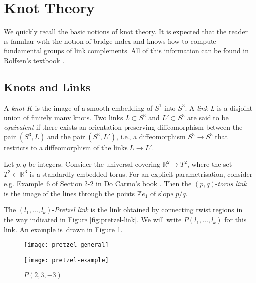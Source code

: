 \documentclass[main.tex]{subfiles}
\begin{document}
\section{Knot Theory}\label{sec:knot-theory}
We quickly recall the basic notions of knot theory. It is expected that the reader is familiar with the notion of bridge index and knows how to compute fundamental groups of link complements. All of this information can be found in Rolfsen's textbook \cite{rolfsen2003}.

\subsection{Knots and Links}
A \textit{knot} $K$ is the image of a smooth embedding of $S^1$ into $S^3$. A \textit{link} $L$ is a disjoint union of finitely many knots. Two links $L \subset S^3$ and $L' \subset S^3$ are said to be \textit{equivalent} if there exists an orientation-preserving diffeomorphism between the pair $(S^3, L)$ and the pair $(S^3, L')$, i.e., a diffeomorphism $S^3 \rightarrow S^3$ that restricts to a diffeomorphism of the links $L \rightarrow L'$.

\begin{example}
Let $p, q$ be integers. Consider the universal covering $\mathbb{R}^2 \rightarrow T^2$, where the set $T^2 \subset \mathbb{R}^3$ is a standardly embedded torus. For an explicit parametrisation, consider e.g. Example~6 of Section 2-2 in Do Carmo's book \cite{docarmo1976}. Then the $(p,q)$-\textit{torus link} is the image of the lines through the points $\mathbb{Z}e_1$ of slope $p/q$.
\end{example}

\begin{example}
The $(l_1, \dots, l_k)$-\textit{Pretzel link} is the link obtained by connecting twist regions in the way indicated in Figure \ref{fig:pretzel-link}. We will write $P(l_1, \dots, l_k)$ for this link. An example is~drawn in Figure \ref{fig:p(2,3,-3)}.

\begin{figure}[ht]
\centering
\begin{minipage}{0.45\textwidth}
\centering
\texttt{[image: pretzel-general]}
\caption{$P(l_1, l_2, \dots, l_k)$}
\label{fig:pretzel-link}
\end{minipage}%
\begin{minipage}{0.4\textwidth}
\centering
\texttt{[image: pretzel-example]}
\caption{$P(2, 3, -3)$}
\label{fig:p(2,3,-3)}
\end{minipage}
\end{figure}
\end{example}
\end{document}
